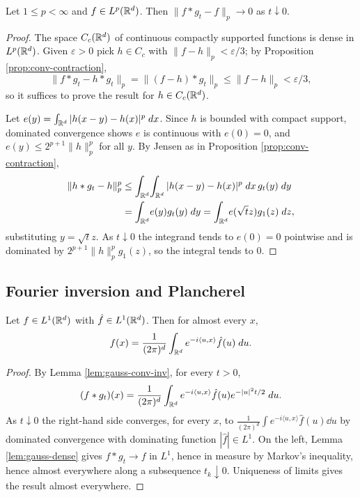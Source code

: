 \documentclass[a4paper]{scrartcl}
\newcommand{\ip}[2]{\langle #1, #2 \rangle}
\begin{document}
\begin{lemma}\label{lem:gauss-dense}
	Let $1\leq p<\infty$ and $f \in L^p(\mathbb{R}^d)$. Then $\|f*g_t - f\|_p \to 0$ as $t \downarrow 0$.
\end{lemma}
\begin{proof}
	The space $C_c(\mathbb{R}^d)$ of continuous compactly supported functions is dense in $L^p(\mathbb{R}^d)$. Given $\varepsilon>0$ pick $h \in C_c$ with $\|f-h\|_p<\varepsilon/3$; by Proposition \ref{prop:conv-contraction},
	$$
	\|f*g_t - h*g_t\|_p = \|(f-h)*g_t\|_p \leq \|f-h\|_p<\varepsilon/3,
	$$
	so it suffices to prove the result for $h \in C_c(\mathbb{R}^d)$.

	Let $e(y)=\int_{\mathbb{R}^d}|h(x-y)-h(x)|^p\; d x$. Since $h$ is bounded with compact support, dominated convergence shows $e$ is continuous with $e(0)=0$, and $e(y) \leq 2^{p+1}\|h\|_p^p$ for all $y$. By Jensen as in Proposition \ref{prop:conv-contraction},
	\begin{align*}
		\|h*g_t - h\|_p^p &\leq \int_{\mathbb{R}^d}\!\int_{\mathbb{R}^d}|h(x-y)-h(x)|^p\; d x\,g_t(y)\; d y\\
		&=\int_{\mathbb{R}^d}\!e(y)g_t(y)\; d y = \int_{\mathbb{R}^d}\!e(\sqrt t z)g_1(z)\; d z,
	\end{align*}
	substituting $y = \sqrt t z$. As $t\downarrow0$ the integrand tends to $e(0)=0$ pointwise and is dominated by $2^{p+1}\|h\|_p^p g_1(z)$, so the integral tends to $0$.
\end{proof}

\subsection{Fourier inversion and Plancherel}

\begin{theorem}\label{thm:fourier-inv}
	Let $f \in L^1(\mathbb{R}^d)$ with $\hat f \in L^1(\mathbb{R}^d)$. Then for almost every $x$,
	$$
	f(x) = \frac{1}{(2\pi)^d}\int_{\R^d}e^{-i\ip{u}{x}}\hat f(u)\dd u.
	$$
\end{theorem}
\begin{proof}
	By Lemma \ref{lem:gauss-conv-inv}, for every $t>0$,
	$$
	(f*g_t)(x)=\frac{1}{(2\pi)^d}\int_{\R^d}e^{-i\ip{u}{x}}\hat f(u)e^{-|u|^2t/2}\dd u.
	$$
	As $t \downarrow 0$ the right-hand side converges, for every $x$, to $\frac{1}{(2\pi)^d}\int e^{-i\ip{u}{x}}\hat f(u)\dd u$ by dominated convergence with dominating function $|\hat f| \in L^1$. On the left, Lemma \ref{lem:gauss-dense} gives $f*g_t \to f$ in $L^1$, hence in measure by Markov's inequality, hence almost everywhere along a subsequence $t_k \downarrow 0$. Uniqueness of limits gives the result almost everywhere.
\end{proof}
\end{document}
